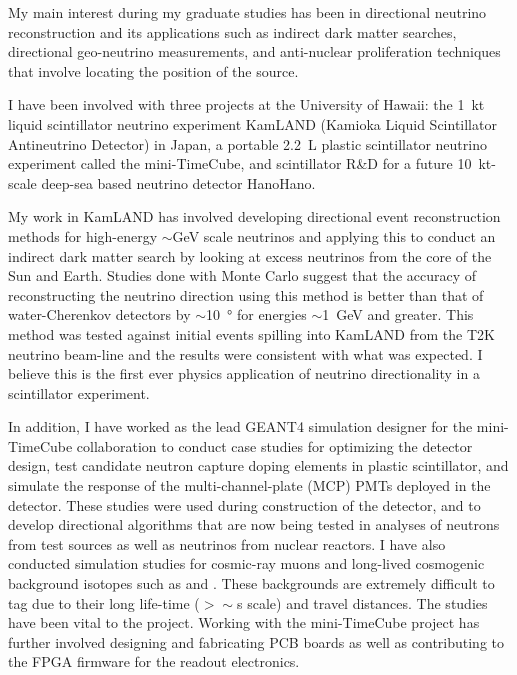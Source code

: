 \documentclass[a4paper,10pt]{article} %
\begin{document}
My main interest during my graduate studies has been in directional neutrino
reconstruction and its applications such as indirect dark matter searches,
directional geo-neutrino measurements, and anti-nuclear proliferation
techniques that involve locating the position of the source.

I have been involved with three projects at the University of Hawaii: the
\SI{1}{\kilo\tonne} liquid scintillator neutrino experiment KamLAND (Kamioka
Liquid Scintillator Antineutrino Detector) in Japan, a portable
\SI{2.2}{\liter} plastic scintillator neutrino experiment called the
mini-TimeCube, and scintillator R\&D for a future \SI{10}{\kilo\tonne}-scale
deep-sea based neutrino detector HanoHano.

My work in KamLAND has involved developing directional event reconstruction
methods for high-energy $\sim$\si{\giga\electronvolt} scale neutrinos and
applying this to conduct an indirect dark matter search by looking at excess
neutrinos from the core of the Sun and Earth. Studies done with Monte Carlo
suggest that the accuracy of reconstructing the neutrino direction using this
method is better than that of water-Cherenkov detectors by
$\sim$\SI{10}{\degree} for energies $\sim$\SI{1}{\giga\electronvolt} and
greater. This method was tested against initial events spilling into KamLAND
from the T2K neutrino beam-line and the results were consistent with what was
expected. I believe this is the first ever physics application of neutrino
directionality in a scintillator experiment.

In addition, I have worked as the lead GEANT4 simulation designer for the
mini-TimeCube collaboration to conduct case studies for optimizing the detector
design, test candidate neutron capture doping elements in plastic scintillator,
and simulate the response of the multi-channel-plate (MCP) PMTs deployed in the
detector. These studies were used during construction of the detector, and to
develop directional algorithms that are now being tested in analyses of neutrons
from test sources as well as neutrinos from nuclear reactors. I have also
conducted simulation studies for cosmic-ray muons and long-lived cosmogenic
background isotopes such as  and . These backgrounds are
extremely difficult to tag due to their long life-time ($>\sim$\si{\second}
scale) and travel distances. The studies have been vital to the project. Working
with the mini-TimeCube project has further involved designing and fabricating
PCB boards as well as contributing to the FPGA firmware for the readout
electronics.
\end{document}
